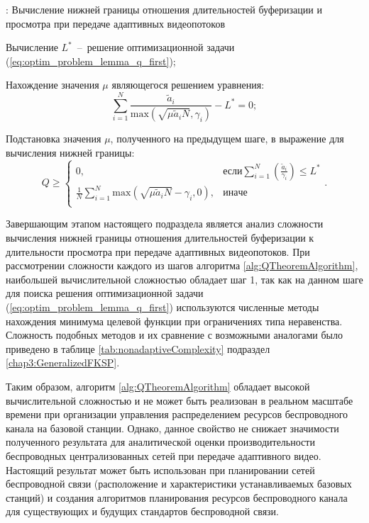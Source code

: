 \begin{algorithm}
  \caption{: Вычисление нижней границы отношения длительностей буферизации и просмотра при передаче адаптивных видеопотоков}
	\label{alg:QTheoremAlgorithm}
  \begin{algorithmic}[1]
	 \item Вычисление $L^{*}$~--~решение оптимизационной задачи (\ref{eq:optim_problem_lemma_q_first});
	 \item Нахождение значения $\mu$ являющегося решением уравнения: $$\sum\limits_{i=1}^{N} {\frac{\tilde{a}_i}{\mathrm{max} \left(\sqrt{\mu \tilde{a}_i N}, \gamma_i\right)}} - L^{*} = 0;$$
	\item Подстановка значения $\mu$, полученного на предыдущем шаге, в выражение для вычисления нижней границы:
	$$Q \geq
	\begin{cases}
	0, & \text{если} \sum\limits_{i=1}^{N} {\left(\frac{\tilde{a}_i}{\gamma_i}\right)} \leq L^{*}\\
	\frac{1}{N} \sum\limits_{i=1}^{N} {\mathrm{max} \left(\sqrt{\mu \tilde{a}_i N}-\gamma_i, 0\right)}, & \mathrm{иначе} \\
	\end{cases}.$$
  \end{algorithmic}
\end{algorithm}

Завершающим этапом настоящего подраздела является анализ сложности вычисления нижней границы отношения длительностей буферизации к длительности просмотра при передаче адаптивных видеопотоков. При рассмотрении сложности каждого из шагов алгоритма \ref{alg:QTheoremAlgorithm}, наибольшей вычислительной сложностью обладает шаг 1, так как на данном шаге для поиска решения оптимизационной задачи (\ref{eq:optim_problem_lemma_q_first}) используются численные методы нахождения минимума целевой функции при ограничениях типа неравенства. Сложность подобных методов и их сравнение с возможными аналогами было приведено в таблице \ref{tab:nonadaptiveComplexity} подраздел \ref{chap3:GeneralizedFKSP}.

Таким образом, алгоритм \ref{alg:QTheoremAlgorithm} обладает высокой вычислительной сложностью и не может быть реализован в реальном масштабе времени при организации управления распределением ресурсов беспроводного канала на базовой станции. Однако, данное свойство не снижает значимости полученного результата для аналитической оценки производительности беспроводных централизованных сетей при передаче адаптивного видео. Настоящий результат может быть использован при планировании сетей беспроводной связи (расположение и характеристики устанавливаемых базовых станций) и создания алгоритмов планирования ресурсов беспроводного канала для существующих и будущих стандартов беспроводной связи.


